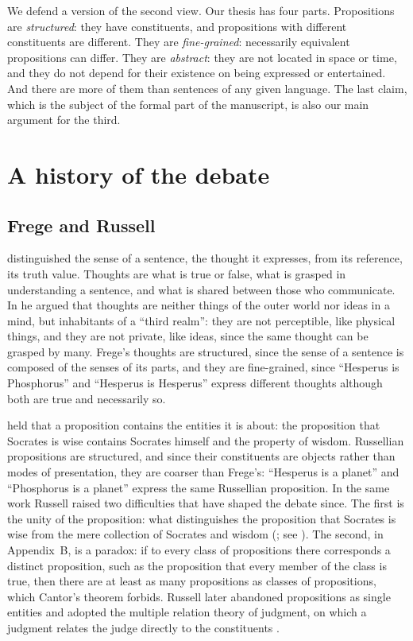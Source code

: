 \documentclass{situationist-preprint}
\begin{document}
We defend a version of the second view. Our thesis has four parts. Propositions are \emph{structured}: they have constituents, and propositions with different constituents are different. They are \emph{fine-grained}: necessarily equivalent propositions can differ. They are \emph{abstract}: they are not located in space or time, and they do not depend for their existence on being expressed or entertained. And there are more of them than sentences of any given language. The last claim, which is the subject of the formal part of the manuscript, is also our main argument for the third.

\section{A history of the debate}\label{s:history}

\subsection{Frege and Russell}

\citet{Frege1892} distinguished the sense of a sentence, the thought it expresses, from its reference, its truth value. Thoughts are what is true or false, what is grasped in understanding a sentence, and what is shared between those who communicate. In \citet{Frege1918} he argued that thoughts are neither things of the outer world nor ideas in a mind, but inhabitants of a \enquote{third realm}: they are not perceptible, like physical things, and they are not private, like ideas, since the same thought can be grasped by many. Frege's thoughts are structured, since the sense of a sentence is composed of the senses of its parts, and they are fine-grained, since \enquote{Hesperus is Phosphorus} and \enquote{Hesperus is Hesperus} express different thoughts although both are true and necessarily so.

\citet{Russell1903} held that a proposition contains the entities it is about: the proposition that Socrates is wise contains Socrates himself and the property of wisdom. Russellian propositions are structured, and since their constituents are objects rather than modes of presentation, they are coarser than Frege's: \enquote{Hesperus is a planet} and \enquote{Phosphorus is a planet} express the same Russellian proposition. In the same work Russell raised two difficulties that have shaped the debate since. The first is the unity of the proposition: what distinguishes the proposition that Socrates is wise from the mere collection of Socrates and wisdom (\citealp[\S 54]{Russell1903}; see \citealp{Gaskin2008}). The second, in Appendix~B, is a paradox: if to every class of propositions there corresponds a distinct proposition, such as the proposition that every member of the class is true, then there are at least as many propositions as classes of propositions, which Cantor's theorem forbids. Russell later abandoned propositions as single entities and adopted the multiple relation theory of judgment, on which a judgment relates the judge directly to the constituents \citep{Russell1912}.
\end{document}

